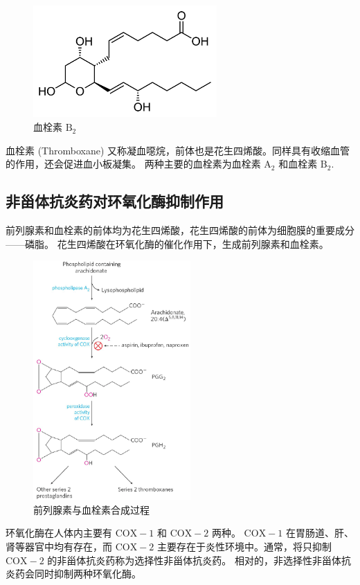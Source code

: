\documentclass[12pt, a4paper, oneside]{ctexart}
\begin{document}
\begin{figure}[htbp]
    \centering
    \includegraphics[width=7cm]{Thromboxane_B2.pdf}
    \caption{血栓素 $\mathrm{B_2}$}
\end{figure} 

血栓素 (Thromboxane) 又称凝血噁烷，前体也是花生四烯酸。同样具有收缩血管的作用，还会促进血小板凝集。
两种主要的血栓素为血栓素 $\mathrm{A_2}$ 和血栓素 $\mathrm{B_2}$. 

\subsection{非甾体抗炎药对环氧化酶抑制作用}

前列腺素和血栓素的前体均为花生四烯酸，花生四烯酸的前体为细胞膜的重要成分——磷脂。
花生四烯酸在环氧化酶的催化作用下，生成前列腺素和血栓素。

\begin{figure}[htbp]
    \centering
    \includegraphics[width=6cm]{Snipaste_2022-11-12_17-55-48.png}
    \caption{前列腺素与血栓素合成过程}
\end{figure} 

环氧化酶在人体内主要有 $\mathrm{COX-1}$ 和 $\mathrm{COX-2}$ 两种。 $\mathrm{COX-1}$ 在胃肠道、肝、肾等器官中均有存在，而
$\mathrm{COX-2}$ 主要存在于炎性环境中。通常，将只抑制 $\mathrm{COX-2}$ 的非甾体抗炎药称为选择性非甾体抗炎药。
相对的，非选择性非甾体抗炎药会同时抑制两种环氧化酶。
\end{document}
